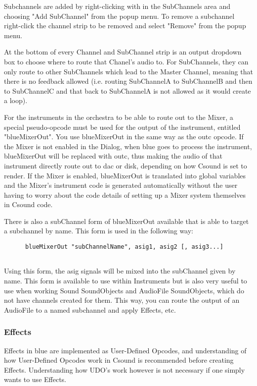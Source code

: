 Subchannels are added by right-clicking with in the SubChannels area and
choosing "Add SubChannel" from the popup menu. To remove a subchannel
right-click the channel strip to be removed and select "Remove" from the
popup menu.

At the bottom of every Channel and SubChannel strip is an output
dropdown box to choose where to route that Chanel's audio to. For
SubChannels, they can only route to other SubChannels which lead to the
Master Channel, meaning that there is no feedback allowed (i.e. routing
SubChannelA to SubChannelB and then to SubChannelC and that back to
SubChannelA is not allowed as it would create a loop).

For the instruments in the orchestra to be able to route out to the
Mixer, a special pseudo-opcode must be used for the output of the
instrument, entitled "blueMixerOut". You use blueMixerOut in the same
way as the outc opcode. If the Mixer is not enabled in the Dialog, when
blue goes to process the instrument, blueMixerOut will be replaced with
outc, thus making the audio of that instrument directly route out to dac
or disk, depending on how Csound is set to render. If the Mixer is
enabled, blueMixerOut is translated into global variables and the
Mixer's instrument code is generated automatically without the user
having to worry about the code details of setting up a Mixer system
themselves in Csound code.

There is also a subChannel form of blueMixerOut available that is able
to target a subchannel by name. This form is used in the following way:

\begin{verbatim}
      blueMixerOut "subChannelName", asig1, asig2 [, asig3...]
    
\end{verbatim}

Using this form, the asig signals will be mixed into the subChannel
given by name. This form is available to use within Instruments but is
also very useful to use when working Sound SoundObjects and AudioFile
SoundObjects, which do not have channels created for them. This way, you
can route the output of an AudioFile to a named subchannel and apply
Effects, etc.

\subsubsection{Effects}

Effects in blue are implemented as User-Defined Opcodes, and
understanding of how User-Defined Opcodes work in Csound is recommended
before creating Effects. Understanding how UDO's work however is not
necessary if one simply wants to use Effects.

